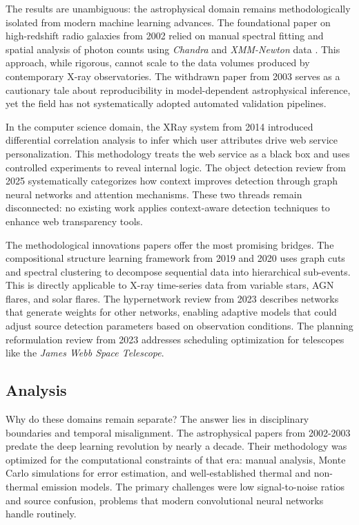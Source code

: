\documentclass[conference]{IEEEtran}
\begin{document}
The results are unambiguous: the astrophysical domain remains methodologically isolated from modern machine learning advances. The foundational paper on high-redshift radio galaxies from 2002 relied on manual spectral fitting and spatial analysis of photon counts using \textit{Chandra} and \textit{XMM-Newton} data \cite{r1}. This approach, while rigorous, cannot scale to the data volumes produced by contemporary X-ray observatories. The withdrawn paper from 2003 \cite{r2} serves as a cautionary tale about reproducibility in model-dependent astrophysical inference, yet the field has not systematically adopted automated validation pipelines.

In the computer science domain, the XRay system from 2014 \cite{r3} introduced differential correlation analysis to infer which user attributes drive web service personalization. This methodology treats the web service as a black box and uses controlled experiments to reveal internal logic. The object detection review from 2025 \cite{r9} systematically categorizes how context improves detection through graph neural networks and attention mechanisms. These two threads remain disconnected: no existing work applies context-aware detection techniques to enhance web transparency tools.

The methodological innovations papers offer the most promising bridges. The compositional structure learning framework from 2019 and 2020 \cite{r4,r5} uses graph cuts and spectral clustering to decompose sequential data into hierarchical sub-events. This is directly applicable to X-ray time-series data from variable stars, AGN flares, and solar flares. The hypernetwork review from 2023 \cite{r7} describes networks that generate weights for other networks, enabling adaptive models that could adjust source detection parameters based on observation conditions. The planning reformulation review from 2023 \cite{r8} addresses scheduling optimization for telescopes like the \textit{James Webb Space Telescope}.

\subsection{Analysis}

Why do these domains remain separate? The answer lies in disciplinary boundaries and temporal misalignment. The astrophysical papers from 2002-2003 predate the deep learning revolution by nearly a decade. Their methodology was optimized for the computational constraints of that era: manual analysis, Monte Carlo simulations for error estimation, and well-established thermal and non-thermal emission models. The primary challenges were low signal-to-noise ratios and source confusion, problems that modern convolutional neural networks handle routinely.
\end{document}
